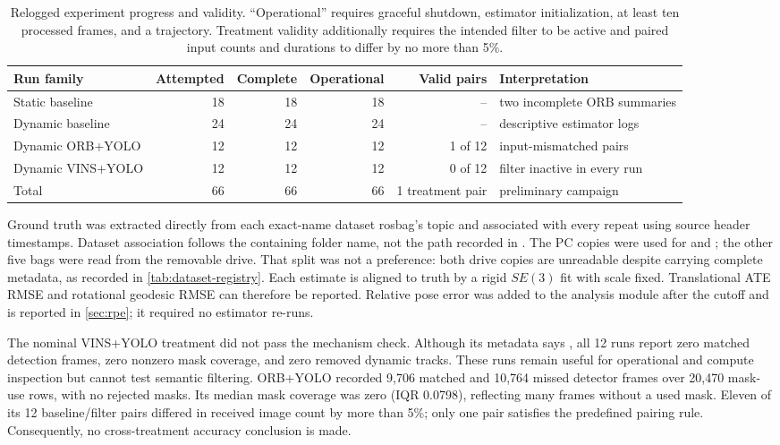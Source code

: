 \begin{table}[htbp]
\centering
\caption{Relogged experiment progress and validity. ``Operational'' requires
graceful shutdown, estimator initialization, at least ten processed frames, and
a trajectory. Treatment validity additionally requires the intended filter to be
active and paired input counts and durations to differ by no more than 5\%.}
\label{tab:run-validity}
\small
\setlength{\tabcolsep}{4pt}
\begin{tabularx}{\textwidth}{>{\raggedright\arraybackslash}p{}rrrr>{\raggedright\arraybackslash}X}
\toprule
Run family & Attempted & Complete & Operational & Valid pairs & Interpretation \\
\midrule
Static baseline & 18 & 18 & 18 & -- & two incomplete ORB summaries \\
Dynamic baseline & 24 & 24 & 24 & -- & descriptive estimator logs \\
Dynamic ORB+YOLO & 12 & 12 & 12 & 1 of 12 & 11 input-mismatched pairs \\
Dynamic VINS+YOLO & 12 & 12 & 12 & 0 of 12 & filter inactive in every run \\
\midrule
Total & 66 & 66 & 66 & 1 treatment pair & preliminary campaign \\
\bottomrule
\end{tabularx}
\end{table}

Ground truth was extracted directly from each exact-name dataset rosbag's
 topic and associated with every repeat using source
header timestamps. Dataset association follows the containing folder name, not
the path recorded in . The PC copies were used for
 and
; the other five bags were read from the
removable drive. That split was not a preference: both drive copies are
unreadable despite carrying complete metadata, as recorded in
\cref{tab:dataset-registry}. Each estimate is aligned to truth by a
rigid $SE(3)$ fit with scale fixed. Translational ATE RMSE and rotational geodesic
RMSE can therefore be reported. Relative pose error was added to the analysis
module after the cutoff and is reported in \cref{sec:rpe}; it required no
estimator re-runs.

The nominal VINS+YOLO treatment did not pass the mechanism check. Although its
metadata says , all 12 runs report zero matched detection
frames, zero nonzero mask coverage, and zero removed dynamic tracks. These runs
remain useful for operational and compute inspection but cannot test semantic
filtering. ORB+YOLO recorded 9,706 matched and 10,764 missed detector frames over
20,470 mask-use rows, with no rejected masks. Its median mask coverage was zero
(IQR 0.0798), reflecting many frames without a used mask. Eleven of its 12
baseline/filter pairs differed in received image count by more than 5\%; only one
pair satisfies the predefined pairing rule. Consequently, no cross-treatment
accuracy conclusion is made.

